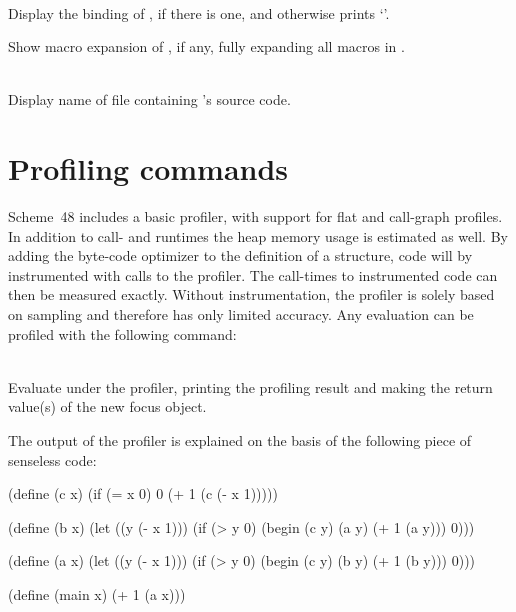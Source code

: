 \begin{description}
\item {}\\
    Display the binding of , if there is one, and otherwise
    prints `'.
 
\item {}
    Show macro expansion of , if any, fully expanding all 
    macros in .

\item {}\\
    Display name of file containing 's source code.
\end{description}


\section{Profiling commands}
\label{profiling-commands}

Scheme~48 includes a basic profiler, with support for flat and call-graph profiles.
In addition to call- and runtimes the heap memory usage is estimated as well.
By adding the byte-code optimizer  to the definition
of a structure, code will by instrumented with calls to the profiler. The call-times to
instrumented code can then be measured exactly.
Without instrumentation, the profiler is solely based on sampling and therefore has only
limited accuracy.
Any evaluation can be profiled with the following command:

\begin{description}

\item {}\\
    Evaluate  under the profiler, printing the profiling result and making the
    return value(s) of  the new focus object.

\end{description}

The output of the profiler is explained on the basis of the following piece of senseless code:

\begin{example}
(define (c x)
  (if (= x 0)
      0
      (+ 1 (c (- x 1)))))

(define (b x)
  (let ((y (- x 1)))
    (if (> y 0)
        (begin
          (c y)
          (a y)
          (+ 1 (a y)))
        0)))

(define (a x)
  (let ((y (- x 1)))
    (if (> y 0)
        (begin
          (c y)
          (b y)
          (+ 1 (b y)))
        0)))

(define (main x)
  (+ 1 (a x)))
\end{example}

